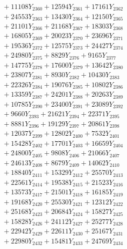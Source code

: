 \documentclass[a4paper,10pt]{article}
\begin{document}
{\begin{align}
&\;  + 11108 Y_{2360} + 12594 Y_{2361} + 17161 Y_{2362} \\[0.3ex]
&\;  + 24553 Y_{2363} + 13430 Y_{2364} + 12150 Y_{2365} \\[0.3ex]
&\;  + 21101 Y_{2366} + 21168 Y_{2367} + 18303 Y_{2368} \\[0.5ex]\allowbreak
&\;  + 16805 Y_{2369} + 20023 Y_{2370} + 23696 Y_{2371} \\[0.3ex]
&\;  + 19536 Y_{2372} + 12575 Y_{2373} + 24427 Y_{2374} \\[0.3ex]
&\;  + 24980 Y_{2375} + 8829 Y_{2376} + 9165 Y_{2377} \\[0.3ex]
&\;  + 14775 Y_{2378} + 17600 Y_{2379} + 13642 Y_{2380} \\[0.3ex]
&\;  + 23807 Y_{2381} + 8930 Y_{2382} + 10430 Y_{2383} \\[0.3ex]
&\;  + 22326 Y_{2384} + 19076 Y_{2385} + 10802 Y_{2386} \\[0.3ex]
&\;  + 13359 Y_{2387} + 24201 Y_{2388} + 20263 Y_{2389} \\[0.3ex]
&\;  + 10785 Y_{2390} + 23400 Y_{2391} + 23089 Y_{2392} \\[0.3ex]
&\;  + 9660 Y_{2393} + 21621 Y_{2394} + 22371 Y_{2395} \\[0.3ex]
&\;  + 8881 Y_{2396} + 19129 Y_{2397} + 20861 Y_{2398} \\[0.5ex]\allowbreak
&\;  + 12037 Y_{2399} + 12802 Y_{2400} + 7532 Y_{2401} \\[0.3ex]
&\;  + 15428 Y_{2402} + 17701 Y_{2403} + 16659 Y_{2404} \\[0.3ex]
&\;  + 24800 Y_{2405} + 9808 Y_{2406} + 21066 Y_{2407} \\[0.3ex]
&\;  + 24613 Y_{2408} + 8679 Y_{2409} + 14062 Y_{2410} \\[0.3ex]
&\;  + 18840 Y_{2411} + 15329 Y_{2412} + 25570 Y_{2413} \\[0.3ex]
&\;  + 22561 Y_{2414} + 19538 Y_{2415} + 21523 Y_{2416} \\[0.3ex]
&\;  + 13573 Y_{2417} + 21501 Y_{2418} + 16185 Y_{2419} \\[0.3ex]
&\;  + 19168 Y_{2420} + 25530 Y_{2421} + 12312 Y_{2422} \\[0.3ex]
&\;  + 25168 Y_{2423} + 20684 Y_{2424} + 15827 Y_{2425} \\[0.3ex]
&\;  + 15828 Y_{2426} + 24112 Y_{2427} + 25277 Y_{2428} \\[0.5ex]\allowbreak
&\;  + 22942 Y_{2429} + 22611 Y_{2430} + 25167 Y_{2431} \\[0.3ex]
&\;  + 22980 Y_{2432} + 15481 Y_{2433} + 24769 Y_{2434} \\[0.3ex]

\end{align}}
\end{document}
